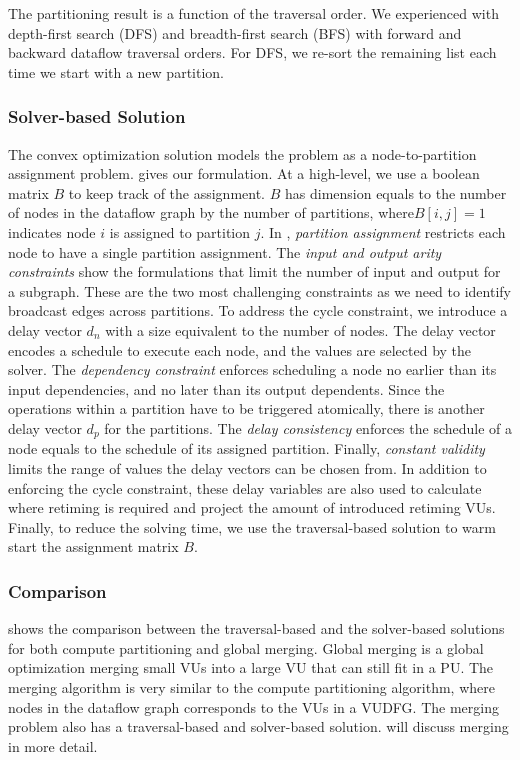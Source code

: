 The partitioning result is a function of the traversal order.
We experienced with depth-first search (DFS) and breadth-first search (BFS) with forward and
backward dataflow traversal orders.
For DFS, we re-sort the remaining list each time we start with a new partition.

\subsubsection{Solver-based Solution}
The convex optimization solution models the problem as a node-to-partition assignment problem.
 gives our formulation.
At a high-level, we use a boolean matrix $B$ to keep track of the assignment. 
$B$ has dimension equals to the number of nodes in the dataflow graph by the number of partitions, where$B[i,j]=1$ 
indicates node $i$ is assigned to partition $j$.
In , \emph{partition assignment} restricts each node to have a single partition assignment.
The \emph{input and output arity constraints} show the formulations that limit the number of input
and output for a subgraph.
These are the two most challenging constraints as we need to identify broadcast edges across partitions.
To address the cycle constraint, we introduce a delay vector $d_n$ with a size equivalent to the number of nodes. 
The delay vector encodes a schedule to execute each node, and the values are selected by the solver.
The \emph{dependency constraint} enforces scheduling a node no earlier than its input dependencies, and
no later than its output dependents.
Since the operations within a partition have to be triggered atomically, there is another delay
vector $d_p$ for the partitions. The \emph{delay consistency} enforces the schedule of a node equals to the
schedule of its assigned partition.
Finally, \emph{constant validity} limits the range of values the delay vectors can be chosen from.
In addition to enforcing the cycle constraint, 
these delay variables are also used to calculate where retiming is required and project the amount of introduced retiming VUs. 
Finally, to reduce the solving time, we use the traversal-based solution to warm start the assignment matrix
$B$.



\subsubsection{Comparison}
 shows the comparison between the traversal-based and the solver-based solutions for both
compute partitioning and global merging.
Global merging is a global optimization merging small VUs into a large VU that can still fit in
a PU. 
The merging algorithm is very similar to the compute partitioning algorithm, where nodes in the
dataflow graph corresponds to the VUs in a VUDFG. 
The merging problem also has a traversal-based and solver-based solution.
 will discuss merging in more detail.

